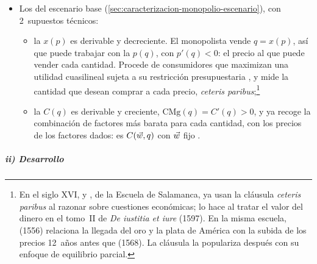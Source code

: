 \documentclass[11pt]{article}
\begin{document}
\begin{itemize}
\item Los del escenario base (\ref{sec:caracterizacion-monopolio-escenario}), con 2~supuestos técnicos:
  \begin{itemize}
  \item la  $x(p)$ es derivable y decreciente. El monopolista vende $q=x(p)$, así que puede trabajar con la  $p(q)$, con $p'(q)<0$: el precio al que puede vender cada cantidad. Procede de consumidores que maximizan una utilidad cuasilineal sujeta a su restricción presupuestaria  , y mide la cantidad que desean comprar a cada precio, \emph{ceteris paribus};\footnote{En el siglo XVI,  y , de la Escuela de Salamanca, ya usan la cláusula \emph{ceteris paribus} al razonar sobre cuestiones económicas;  lo hace al tratar el valor del dinero en el tomo~II de \emph{De iustitia et iure} (1597)\nocite{SEP2024Ceteris}. En la misma escuela,  (1556) relaciona la llegada del oro y la plata de América con la subida de los precios 12~años antes que  (1568). La cláusula la populariza después  con su enfoque de equilibrio parcial.}
  \item la  $C(q)$ es derivable y creciente, $\mathrm{CMg}(q)=C'(q)>0$, y ya recoge la combinación de factores más barata para cada cantidad, con los precios de los factores dados: es $C(\vec{w},q)$ con $\vec{w}$ fijo .
  \end{itemize}
\end{itemize}

\subparagraph{ii) Desarrollo}
\end{document}
